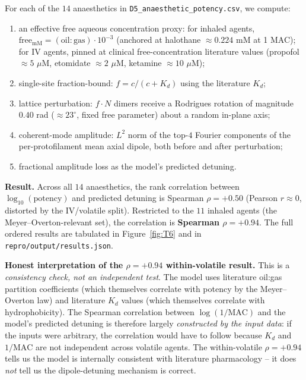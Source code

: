 \documentclass[11pt,a4paper]{article}
\begin{document}
For each of the $14$ anaesthetics in \texttt{D5\_anaesthetic\_potency.csv},
we compute:
\begin{enumerate}\itemsep0pt
  \item an effective free aqueous concentration proxy: for inhaled agents,
    $\mathrm{free}_{\mathrm{mM}} = (\mathrm{oil\!:\!gas}) \cdot 10^{-3}$
    (anchored at halothane $\approx 0.224$ mM at 1 MAC); for IV agents,
    pinned at clinical free-concentration literature values
    (propofol $\approx 5$ $\mu$M, etomidate $\approx 2$ $\mu$M, ketamine
    $\approx 10$ $\mu$M);
  \item single-site fraction-bound: $f = c / (c + K_d)$ using the literature $K_d$;
  \item lattice perturbation: $f \cdot N$ dimers receive a Rodrigues rotation
    of magnitude $0.40$ rad ($\approx 23^\circ$, fixed free parameter) about
    a random in-plane axis;
  \item coherent-mode amplitude: $L^2$ norm of the top-$4$ Fourier components
    of the per-protofilament mean axial dipole, both before and after
    perturbation;
  \item fractional amplitude loss as the model's predicted detuning.
\end{enumerate}

\textbf{Result.} Across all $14$ anaesthetics, the rank correlation between
$\log_{10}(\mathrm{potency})$ and predicted detuning is Spearman $\rho =
+0.50$ (Pearson $r \approx 0$, distorted by the IV/volatile split).
Restricted to the $11$ inhaled agents (the Meyer--Overton-relevant set),
the correlation is \textbf{Spearman $\rho = +0.94$}. The full ordered
results are tabulated in Figure~\ref{fig:T6} and in
\texttt{repro/output/results.json}.

\textbf{Honest interpretation of the $\rho = +0.94$ within-volatile result.}
This is a \emph{consistency check, not an independent test}. The model
uses literature oil:gas partition coefficients (which themselves correlate
with potency by the Meyer--Overton law) and literature $K_d$ values
(which themselves correlate with hydrophobicity). The Spearman correlation
between $\log(1/\mathrm{MAC})$ and the model's predicted detuning is
therefore largely \emph{constructed by the input data}: if the inputs
were arbitrary, the correlation would have to follow because $K_d$ and
$1/\mathrm{MAC}$ are not independent across volatile agents. The
within-volatile $\rho = +0.94$ tells us the model is internally consistent
with literature pharmacology -- it does \emph{not} tell us the dipole-detuning
mechanism is correct.
\end{document}
